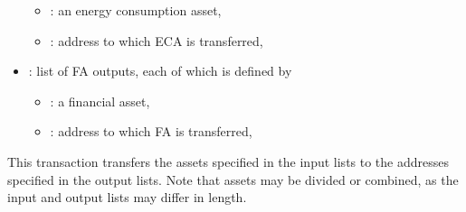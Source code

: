 \begin{itemize}[noitemsep,topsep=-\parskip]
\begin{itemize}[leftmargin=0.5em,nosep]
\item {}: an energy consumption asset,
\item {}: address to which ECA is transferred,
\end{itemize}
\item {}: list of FA outputs, each of which is defined by
\begin{itemize}[leftmargin=0.5em,nosep]
\item {}: a financial asset,
\item {}: address to which FA is transferred,
\end{itemize}
\end{itemize}
\vspace{0.5\parskip}
This transaction transfers the assets specified in the input lists to the addresses specified in the output lists. 
Note that assets may be divided or combined, as the input and output lists may differ in length.

